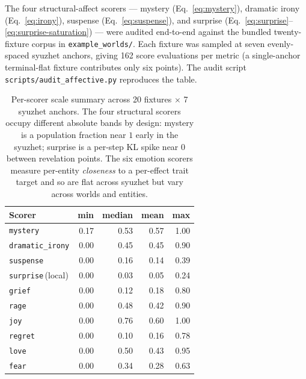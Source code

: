 \documentclass[11pt]{article}
\begin{document}
The four structural-affect scorers --- mystery
(Eq.~\ref{eq:mystery}), dramatic irony (Eq.~\ref{eq:irony}),
suspense (Eq.~\ref{eq:suspense}), and surprise
(Eq.~\ref{eq:surprise}--\ref{eq:surprise-saturation}) --- were
audited end-to-end against the bundled twenty-fixture corpus in
\texttt{example\_worlds/}. Each fixture was sampled at seven
evenly-spaced syuzhet anchors, giving 162 score evaluations per
metric (a single-anchor terminal-flat fixture contributes only
six points). The audit script
\texttt{scripts/audit\_affective.py} reproduces the table.

\begin{table}[h]
\centering
\small
\begin{tabular}{lrrrr}
\toprule
Scorer & min & median & mean & max \\
\midrule
\texttt{mystery}        & 0.17 & 0.53 & 0.57 & 1.00 \\
\texttt{dramatic\_irony} & 0.00 & 0.45 & 0.45 & 0.90 \\
\texttt{suspense}       & 0.00 & 0.16 & 0.14 & 0.39 \\
\texttt{surprise}\,(local) & 0.00 & 0.03 & 0.05 & 0.24 \\
\midrule
\texttt{grief}          & 0.00 & 0.12 & 0.18 & 0.80 \\
\texttt{rage}           & 0.00 & 0.48 & 0.42 & 0.90 \\
\texttt{joy}            & 0.00 & 0.76 & 0.60 & 1.00 \\
\texttt{regret}         & 0.00 & 0.10 & 0.16 & 0.78 \\
\texttt{love}           & 0.00 & 0.50 & 0.43 & 0.95 \\
\texttt{fear}           & 0.00 & 0.34 & 0.28 & 0.63 \\
\bottomrule
\end{tabular}
\caption{Per-scorer scale summary across 20 fixtures $\times$
7 syuzhet anchors. The four structural scorers occupy different
absolute bands by design: mystery is a population fraction near
$1$ early in the syuzhet; surprise is a per-step KL spike near
$0$ between revelation points. The six emotion scorers measure
per-entity \emph{closeness} to a per-effect trait target and so
are flat across syuzhet but vary across worlds and entities.}
\label{tab:scorer-scale}
\end{table}
\end{document}
